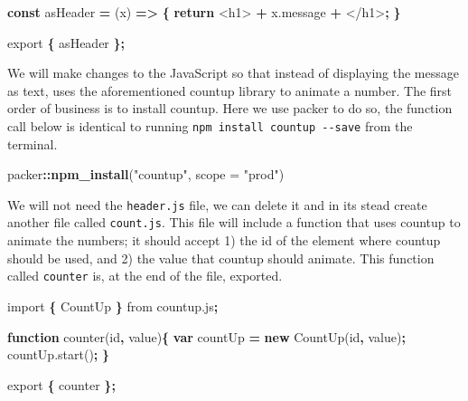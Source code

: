 \documentclass[
]{krantz}
\makeatletter
\newenvironment{Shaded}{\begin{snugshade}}{\end{snugshade}}
\newcommand{\AttributeTok}[1]{\textcolor[rgb]{0.61,0.61,0.61}{#1}}
\newcommand{\ControlFlowTok}[1]{\textcolor[rgb]{0.27,0.27,0.27}{\textbf{#1}}}
\newcommand{\DataTypeTok}[1]{\textcolor[rgb]{0.27,0.27,0.27}{#1}}
\newcommand{\ImportTok}[1]{#1}
\newcommand{\KeywordTok}[1]{\textcolor[rgb]{0.27,0.27,0.27}{\textbf{#1}}}
\newcommand{\NormalTok}[1]{#1}
\newcommand{\OperatorTok}[1]{\textcolor[rgb]{0.43,0.43,0.43}{\textbf{#1}}}
\newcommand{\StringTok}[1]{\textcolor[rgb]{0.5,0.5,0.5}{#1}}
\newcommand{\VariableTok}[1]{\textcolor[rgb]{0,0,0}{#1}}
\newenvironment{kframe}{%
\medskip{}
\setlength{\fboxsep}{.8em}
 \def\at@end@of@kframe{}%
 \ifinner\ifhmode%
  \def\at@end@of@kframe{\end{minipage}}%
  \begin{minipage}{\columnwidth}%
 \fi\fi%
 \def\FrameCommand##1{\hskip\@totalleftmargin \hskip-\fboxsep
 \colorbox{shadecolor}{##1}\hskip-\fboxsep
     \hskip-\linewidth \hskip-\@totalleftmargin \hskip\columnwidth}%
 \MakeFramed {\advance\hsize-\width
   \@totalleftmargin\z@ \linewidth\hsize
   \@setminipage}}%
 {\par\unskip\endMakeFramed%
 \at@end@of@kframe}
\renewenvironment{Shaded}{\begin{kframe}}{\end{kframe}}
\makeatother
\begin{document}
\begin{Shaded}
\begin{Highlighting}[]
\KeywordTok{const}\NormalTok{ asHeader }\OperatorTok{=}\NormalTok{ (x) }\KeywordTok{=>} \OperatorTok{\{}
  \ControlFlowTok{return} \StringTok{\textquotesingle{}<h1>\textquotesingle{}} \OperatorTok{+} \VariableTok{x}\NormalTok{.}\AttributeTok{message} \OperatorTok{+} \StringTok{\textquotesingle{}</h1>\textquotesingle{}}\OperatorTok{;}
\OperatorTok{\}}

\ImportTok{export} \OperatorTok{\{}\NormalTok{ asHeader }\OperatorTok{\};}
\end{Highlighting}
\end{Shaded}

We will make changes to the JavaScript so that instead of displaying the message as text, uses the aforementioned countup library to animate a number. The first order of business is to install countup. Here we use packer to do so, the function call below is identical to running \texttt{npm\ install\ countup\ -\/-save} from the terminal.

\begin{Shaded}
\begin{Highlighting}[]
\NormalTok{packer}\OperatorTok{::}\KeywordTok{npm\_install}\NormalTok{(}\StringTok{"countup"}\NormalTok{, }\DataTypeTok{scope =} \StringTok{"prod"}\NormalTok{) }
\end{Highlighting}
\end{Shaded}

We will not need the \texttt{header.js} file, we can delete it and in its stead create another file called \texttt{count.js}. This file will include a function that uses countup to animate the numbers; it should accept 1) the id of the element where countup should be used, and 2) the value that countup should animate. This function called \texttt{counter} is, at the end of the file, exported.

\begin{Shaded}
\begin{Highlighting}[]
\ImportTok{import} \OperatorTok{\{}\NormalTok{ CountUp }\OperatorTok{\}} \ImportTok{from} \StringTok{\textquotesingle{}countup.js\textquotesingle{}}\OperatorTok{;}

\KeywordTok{function} \AttributeTok{counter}\NormalTok{(id}\OperatorTok{,}\NormalTok{ value)}\OperatorTok{\{}
  \KeywordTok{var}\NormalTok{ countUp }\OperatorTok{=} \KeywordTok{new} \AttributeTok{CountUp}\NormalTok{(id}\OperatorTok{,}\NormalTok{ value)}\OperatorTok{;}
  \VariableTok{countUp}\NormalTok{.}\AttributeTok{start}\NormalTok{()}\OperatorTok{;}
\OperatorTok{\}}

\ImportTok{export} \OperatorTok{\{}\NormalTok{ counter }\OperatorTok{\};}
\end{Highlighting}
\end{Shaded}
\end{document}
